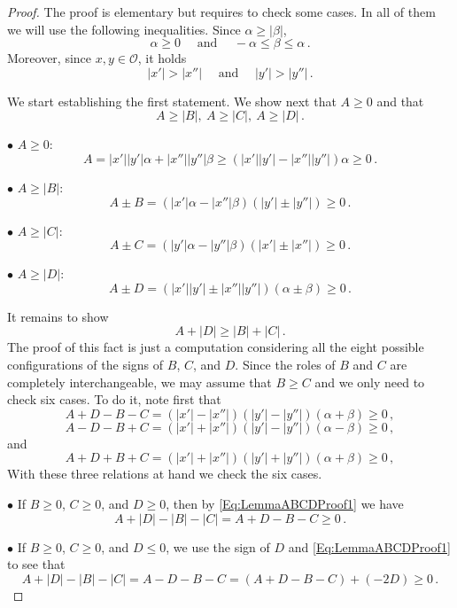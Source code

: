 \documentclass[12pt,reqno]{amsart}
\theoremstyle{definition}
\theoremstyle{remark}
\newcommand{\ocal}{\mathcal{O}}
\numberwithin{equation}{section}
\begin{document}
\begin{proof} The proof is elementary but requires to check some cases. In all of them we will use the following inequalities. Since $\alpha \geq |\beta |$,
	$$
	\alpha\geq 0 \quad \textrm{ and } \quad  -\alpha \leq \beta \leq \alpha\,.
	$$
	Moreover, since $x,y\in\ocal$, it holds
	$$
	|x'|>|x''| \quad \textrm{ and } \quad |y'|>|y''|\,.
	$$
	
	
	We start establishing the first statement. We show next that $A\geq 0$ and that
	$$
	A \geq |B|, \ A \geq |C| ,\ A \geq |D|\,.
	$$
	
	
	$\bullet$ $A \geq 0$:
	$$
	A =  |x'||y'|  \alpha + |x''||y''|\beta \geq (|x'||y'|  - |x''||y''|)\alpha \geq 0\,.
	$$
	
	$\bullet$ $A \geq |B|$:
	$$
	A\pm B = (|x'|\alpha-|x''|\beta)(|y'|\pm |y''|) \geq 0\,.
	$$
	
	$\bullet$ $A \geq |C|$:
	$$
	A\pm C = (|y'|\alpha-|y''|\beta)(|x'|\pm |x''|)  \geq 0\,.
	$$
	
	$\bullet$ $A \geq |D|$:
	$$
	A\pm D = (|x'||y'| \pm |x''||y''|)(\alpha \pm \beta) \geq 0\,.
	$$
	
	
	It remains to show
	$$
	A + |D| \geq |B| + |C|\,.
	$$
	The proof of this fact is just a computation considering all the eight possible configurations of the signs of $B$, $C$, and $D$. Since the roles of $B$ and $C$ are completely interchangeable, we may assume that $B \geq C$ and we only need to check six cases. To do it, note first that
	\begin{equation}
	\label{Eq:LemmaABCDProof1}
	A + D - B - C = (|x'|-|x''|)(|y'|-|y''|)(\alpha + \beta) \geq 0 \,,
	\end{equation}
	\begin{equation}
	\label{Eq:LemmaABCDProof2}
	A - D - B + C = (|x'|+|x''|)(|y'|-|y''|)(\alpha - \beta) \geq 0 \,,
	\end{equation}
	and
	\begin{equation}
	\label{Eq:LemmaABCDProof3}
	A + D + B + C = (|x'|+|x''|)(|y'|+|y''|)(\alpha + \beta) \geq 0 \,,
	\end{equation}
	With these three relations at hand we check the six cases.
	
	$\bullet$ If $B \geq 0$, $C \geq 0$, and $D \geq 0$, then by \eqref{Eq:LemmaABCDProof1} we have
	$$
	A + |D| - |B| - |C| = A + D - B - C \geq 0\,.
	$$
	
	$\bullet$ If $B \geq 0$, $C \geq 0$, and $D \leq 0$, we use the sign of $D$ and \eqref{Eq:LemmaABCDProof1} to see that
	$$
	A + |D| - |B| - |C| = A - D - B - C =  (A + D - B - C) + (-2D) \geq 0\,.
	$$
	

\end{proof}
\end{document}
